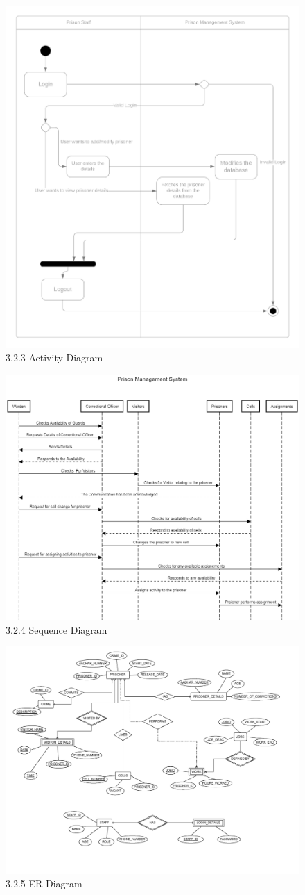 \documentclass[aspectratio=169]{beamer}
\begin{document}
\begin{frame}{}%
    \begin{figure}
        \centering
        \includegraphics[width=0.5\linewidth,height=0.85\textheight]{activity.png}
        \caption{3.2.3 Activity Diagram}
        \label{fig:activity}
    \end{figure}
\end{frame}

\begin{frame}{}%
    \begin{figure}
        \centering
        \includegraphics[width=0.5\linewidth,height=0.85\textheight]{sequence.png}
        \caption{3.2.4 Sequence Diagram}
        \label{fig:sequence}
    \end{figure}
\end{frame}
\begin{frame}{}%
    \begin{figure}
        \centering
        \includegraphics[width=0.7\linewidth,height=0.87\textheight]{ercomp.png}
        \caption{3.2.5 ER Diagram}
        \label{fig:er}
    \end{figure}
\end{frame}
\end{document}
